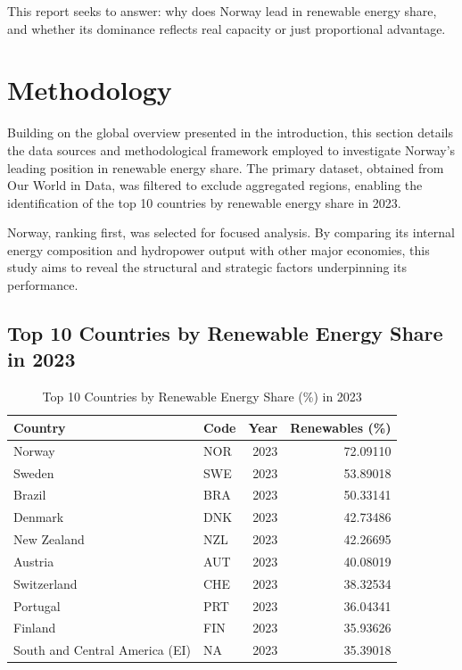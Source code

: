 \documentclass[
  11pt,
  a4paper,
]{article}
\begin{document}
This report seeks to answer: why does Norway lead in renewable energy
share, and whether its dominance reflects real capacity or just
proportional advantage.

\newpage

\section{Methodology}\label{methodology}

Building on the global overview presented in the introduction, this
section details the data sources and methodological framework employed
to investigate Norway's leading position in renewable energy share. The
primary dataset, obtained from Our World in Data, was filtered to
exclude aggregated regions, enabling the identification of the top 10
countries by renewable energy share in 2023.

Norway, ranking first, was selected for focused analysis. By comparing
its internal energy composition and hydropower output with other major
economies, this study aims to reveal the structural and strategic
factors underpinning its performance.

\subsection{Top 10 Countries by Renewable Energy Share in
2023}\label{top-10-countries-by-renewable-energy-share-in-2023}

\begin{longtable}[]{@{}llrr@{}}

\caption{\label{tbl-table-top10}Top 10 Countries by Renewable Energy
Share (\%) in 2023}

\tabularnewline

\toprule\noalign{}
Country & Code & Year & Renewables (\%) \\
\midrule\noalign{}
\endhead
\bottomrule\noalign{}
\endlastfoot
Norway & NOR & 2023 & 72.09110 \\
Sweden & SWE & 2023 & 53.89018 \\
Brazil & BRA & 2023 & 50.33141 \\
Denmark & DNK & 2023 & 42.73486 \\
New Zealand & NZL & 2023 & 42.26695 \\
Austria & AUT & 2023 & 40.08019 \\
Switzerland & CHE & 2023 & 38.32534 \\
Portugal & PRT & 2023 & 36.04341 \\
Finland & FIN & 2023 & 35.93626 \\
South and Central America (EI) & NA & 2023 & 35.39018 \\

\end{longtable}
\end{document}
